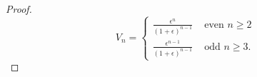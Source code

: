 \begin{proof}
\[
V_{n}=
\left\{
\begin{array}{rl}
\frac{\epsilon^{n}}{(1+\epsilon)^{n-1}} & \mbox{ even }n\geq 2\\
\frac{\epsilon^{n-1}}{(1+\epsilon)^{n-1}} & \mbox{ odd }n\geq 3. 
\end{array} \right.
\]   
\end{proof}

\eappendix
